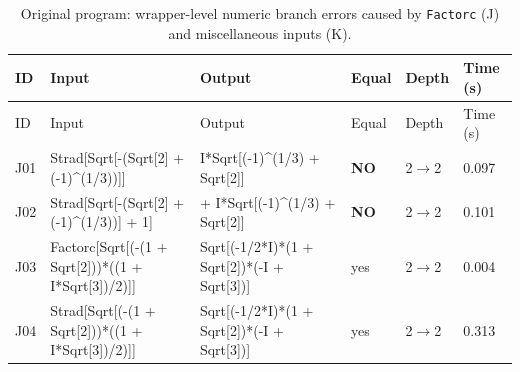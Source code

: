 \begin{longtable}{@{}p{}>{\ttfamily\footnotesize\raggedright\arraybackslash}p{}>{\ttfamily\footnotesize\raggedright\arraybackslash}p{}p{}p{}p{}@{}}
\caption{Original program: wrapper-level numeric branch errors caused by \texttt{Factorc} (J) and miscellaneous inputs (K).}\label{tab:r2JK}\\
\toprule ID & Input & Output & Equal & Depth & Time (s)\\\midrule\endfirsthead
\toprule ID & Input & Output & Equal & Depth & Time (s)\\\midrule\endhead
\bottomrule\endfoot
J01 & Strad[\allowbreak{}Sqrt[\allowbreak{}-(\allowbreak{}Sqrt[\allowbreak{}2]\allowbreak{} +\allowbreak{} (\allowbreak{}-1)\allowbreak{}\textasciicircum{}\allowbreak{}(\allowbreak{}1/\allowbreak{}3)\allowbreak{})\allowbreak{}]\allowbreak{}]\allowbreak{} & I*\allowbreak{}Sqrt[\allowbreak{}(\allowbreak{}-1)\allowbreak{}\textasciicircum{}\allowbreak{}(\allowbreak{}1/\allowbreak{}3)\allowbreak{} +\allowbreak{} Sqrt[\allowbreak{}2]\allowbreak{}]\allowbreak{} & \textbf{NO} & 2$\to$2 & 0.097\\
J02 & Strad[\allowbreak{}Sqrt[\allowbreak{}-(\allowbreak{}Sqrt[\allowbreak{}2]\allowbreak{} +\allowbreak{} (\allowbreak{}-1)\allowbreak{}\textasciicircum{}\allowbreak{}(\allowbreak{}1/\allowbreak{}3)\allowbreak{})\allowbreak{}]\allowbreak{} +\allowbreak{} 1]\allowbreak{} & 1 +\allowbreak{} I*\allowbreak{}Sqrt[\allowbreak{}(\allowbreak{}-1)\allowbreak{}\textasciicircum{}\allowbreak{}(\allowbreak{}1/\allowbreak{}3)\allowbreak{} +\allowbreak{} Sqrt[\allowbreak{}2]\allowbreak{}]\allowbreak{} & \textbf{NO} & 2$\to$2 & 0.101\\
J03 & Factorc[\allowbreak{}Sqrt[\allowbreak{}(\allowbreak{}-(\allowbreak{}1 +\allowbreak{} Sqrt[\allowbreak{}2]\allowbreak{})\allowbreak{})\allowbreak{}*\allowbreak{}(\allowbreak{}(\allowbreak{}1 +\allowbreak{} I*\allowbreak{}Sqrt[\allowbreak{}3]\allowbreak{})\allowbreak{}/\allowbreak{}2)\allowbreak{}]\allowbreak{}]\allowbreak{} & Sqrt[\allowbreak{}(\allowbreak{}-1/\allowbreak{}2*\allowbreak{}I)\allowbreak{}*\allowbreak{}(\allowbreak{}1 +\allowbreak{} Sqrt[\allowbreak{}2]\allowbreak{})\allowbreak{}*\allowbreak{}(\allowbreak{}-I +\allowbreak{} Sqrt[\allowbreak{}3]\allowbreak{})\allowbreak{}]\allowbreak{} & yes & 2$\to$2 & 0.004\\
J04 & Strad[\allowbreak{}Sqrt[\allowbreak{}(\allowbreak{}-(\allowbreak{}1 +\allowbreak{} Sqrt[\allowbreak{}2]\allowbreak{})\allowbreak{})\allowbreak{}*\allowbreak{}(\allowbreak{}(\allowbreak{}1 +\allowbreak{} I*\allowbreak{}Sqrt[\allowbreak{}3]\allowbreak{})\allowbreak{}/\allowbreak{}2)\allowbreak{}]\allowbreak{}]\allowbreak{} & Sqrt[\allowbreak{}(\allowbreak{}-1/\allowbreak{}2*\allowbreak{}I)\allowbreak{}*\allowbreak{}(\allowbreak{}1 +\allowbreak{} Sqrt[\allowbreak{}2]\allowbreak{})\allowbreak{}*\allowbreak{}(\allowbreak{}-I +\allowbreak{} Sqrt[\allowbreak{}3]\allowbreak{})\allowbreak{}]\allowbreak{} & yes & 2$\to$2 & 0.313\\

\end{longtable}
